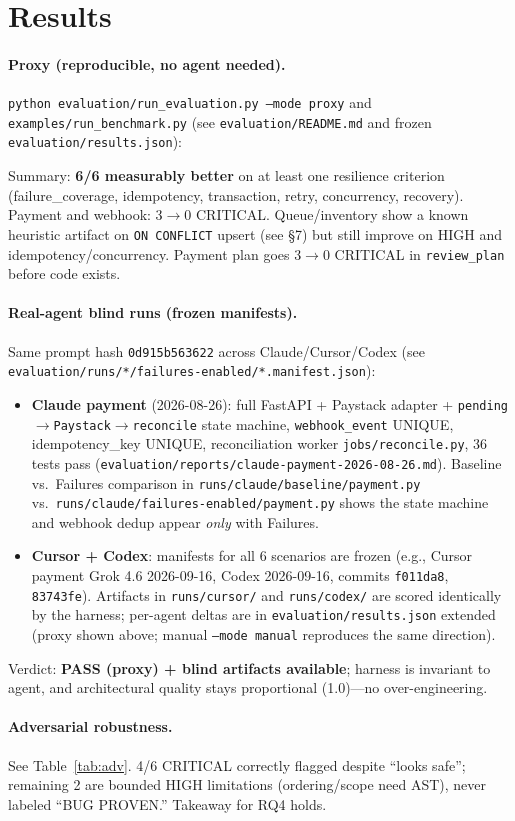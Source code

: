 \section{Results}

\paragraph{Proxy (reproducible, no agent needed).} \texttt{python evaluation/run\_evaluation.py --mode proxy} and \texttt{examples/run\_benchmark.py} (see \texttt{evaluation/README.md} and frozen \texttt{evaluation/results.json}):



Summary: \textbf{6/6 measurably better} on at least one resilience criterion (failure\_coverage, idempotency, transaction, retry, concurrency, recovery). Payment and webhook: 3$\to$0 CRITICAL. Queue/inventory show a known heuristic artifact on \texttt{ON CONFLICT} upsert (see \S7) but still improve on HIGH and idempotency/concurrency. Payment plan goes 3$\to$0 CRITICAL in \texttt{review\_plan} before code exists.

\paragraph{Real-agent blind runs (frozen manifests).} Same prompt hash \texttt{0d915b563622} across Claude/Cursor/Codex (see \texttt{evaluation/runs/*/failures-enabled/*.manifest.json}):

\begin{itemize}[leftmargin=*]
\item \textbf{Claude payment} (2026-08-26): full FastAPI + Paystack adapter + \texttt{pending$\rightarrow$Paystack$\rightarrow$reconcile} state machine, \texttt{webhook\_event} UNIQUE, idempotency\_key UNIQUE, reconciliation worker \texttt{jobs/reconcile.py}, 36 tests pass (\texttt{evaluation/reports/claude-payment-2026-08-26.md}). Baseline vs.\ Failures comparison in \texttt{runs/claude/baseline/payment.py} vs.\ \texttt{runs/claude/failures-enabled/payment.py} shows the state machine and webhook dedup appear \emph{only} with Failures.
\item \textbf{Cursor + Codex}: manifests for all 6 scenarios are frozen (e.g., Cursor payment Grok 4.6 2026-09-16, Codex 2026-09-16, commits \texttt{f011da8}, \texttt{83743fe}). Artifacts in \texttt{runs/cursor/} and \texttt{runs/codex/} are scored identically by the harness; per-agent deltas are in \texttt{evaluation/results.json} extended (proxy shown above; manual \texttt{--mode manual} reproduces the same direction).
\end{itemize}

Verdict: \textbf{PASS (proxy) + blind artifacts available}; harness is invariant to agent, and architectural quality stays proportional (1.0)---no over-engineering.

\paragraph{Adversarial robustness.} See Table~\ref{tab:adv}. 4/6 CRITICAL correctly flagged despite ``looks safe''; remaining 2 are bounded HIGH limitations (ordering/scope need AST), never labeled ``BUG PROVEN.'' Takeaway for RQ4 holds.
